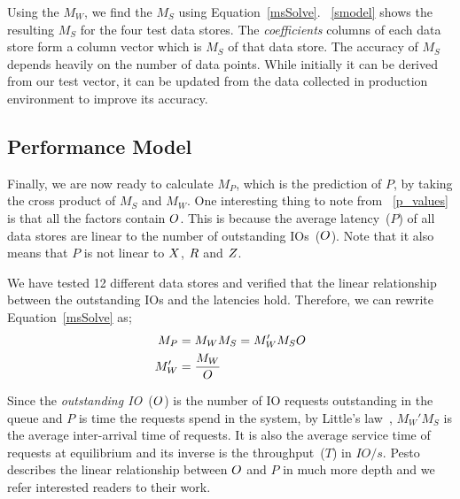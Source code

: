 Using the $M_W$, we find the $M_S$ using Equation~\ref{msSolve}.
\tablename~\ref{smodel} shows the resulting $M_S$ for the four test data stores.
The \emph{coefficients} columns of each data store form a column vector which is $M_S$ of that data store.
The accuracy of $M_S$ depends heavily on the number of data points.
While initially it can be derived from our test vector, it can be updated from the data collected in production environment to improve its accuracy.

\subsection{Performance Model}
Finally, we are now ready to calculate $M_P$, which is the prediction of $P$, by taking the cross product of $M_S$ and $M_W$.
One interesting thing to note from \tablename~\ref{p_values} is that all the factors contain $O$.
This is because the average latency~($P$) of all data stores are linear to the number of outstanding IOs~($O$).
Note that it also means that $P$ is not linear to $X$, $R$ and $Z$.

We have tested 12 different data stores and verified that the linear relationship between the outstanding IOs and the latencies hold.
Therefore, we can rewrite Equation~\ref{msSolve} as;
\begin{equation}\label{rpm:eq}
\begin{split}
M_P&=M_WM_S=M_W'M_SO\\
M_W'&=\frac{M_W}{O}
\end{split}
\end{equation}

Since the \emph{outstanding IO}~($O$) is the number of IO requests outstanding in the queue and $P$ is time the requests spend in the system, by Little's law~\cite{little:1961}, $M_W'M_S$ is the average inter-arrival time of requests.
It is also the average service time of requests at equilibrium and its inverse is the throughput~($T$) in $\mathit{IO}/s$.
Pesto~\cite{gulati:2011} describes the linear relationship between $O$ and $P$ in much more depth and we refer interested readers to their work.

